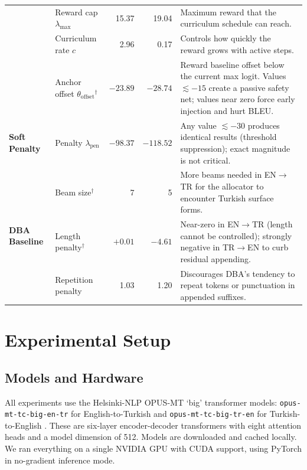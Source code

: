 \documentclass{CUP-JNL-NLP}
\begin{document}
\begin{table}[htbp]
{\begin{minipage}{\textwidth}
\begin{tabular}{llrrp{4.2cm}}
        & Reward cap $\lambda_{\text{max}}$ & 15.37 & 19.04
          & Maximum reward that the curriculum schedule can reach. \\
        & Curriculum rate $c$ & 2.96 & 0.17
          & Controls how quickly the reward grows with active steps. \\
        & Anchor offset $\theta_{\text{offset}}$$^\dagger$ & $-23.89$ & $-28.74$
          & Reward baseline offset below the current max logit. Values
            $\lesssim{-}15$ create a passive safety net; values near zero
            force early injection and hurt BLEU. \\
      \midrule
      \multirow{1}{*}{\textbf{Soft Penalty}}
        & Penalty $\lambda_{\text{pen}}$ & $-98.37$ & $-118.52$
          & Any value $\lesssim{-}30$ produces identical results (threshold
            suppression); exact magnitude is not critical. \\
      \midrule
      \multirow{3}{*}{\textbf{DBA Baseline}}
        & Beam size$^\dagger$ & 7 & 5
          & More beams needed in EN$\rightarrow$TR for the allocator to
            encounter Turkish surface forms. \\
        & Length penalty$^\dagger$ & $+0.01$ & $-4.61$
          & Near-zero in EN$\rightarrow$TR (length cannot be controlled);
            strongly negative in TR$\rightarrow$EN to curb residual appending. \\
        & Repetition penalty & 1.03 & 1.20
          & Discourages DBA's tendency to repeat tokens or punctuation in
            appended suffixes. \\
      \bottomrule
    \end{tabular}
  \end{minipage}}
  {}
  \label{tab:hpo_params}
\end{table}

\section{Experimental Setup}

\subsection{Models and Hardware}

All experiments use the Helsinki-NLP OPUS-MT `big' transformer models:
\texttt{opus-mt-tc-big-en-tr} for English-to-Turkish and
\texttt{opus-mt-tc-big-tr-en} for Turkish-to-English
\citep{tiedemann2020opus,tiedemann2023democratizing}. These are six-layer
encoder-decoder transformers with eight attention heads and a model dimension of
512. Models are downloaded and cached locally. We ran everything on a single NVIDIA
GPU with CUDA support, using PyTorch \citep{paszke2019pytorch} in no-gradient
inference mode.
\end{document}
